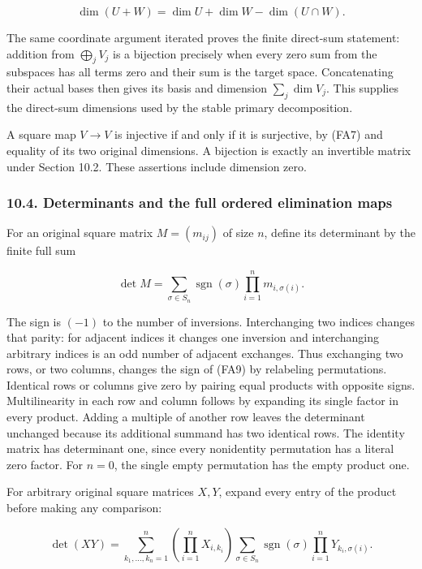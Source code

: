 \documentclass[
  11pt,
]{article}
\begin{document}
\[
\dim(U+W)=\dim U+\dim W-\dim(U\cap W).
\tag{FA8}
\]

The same coordinate argument iterated proves the finite direct-sum
statement: addition from \(\bigoplus_j V_j\) is a bijection precisely
when every zero sum from the subspaces has all terms zero and their sum
is the target space. Concatenating their actual bases then gives its
basis and dimension \(\sum_j\dim V_j\). This supplies the direct-sum
dimensions used by the stable primary decomposition.

A square map \(V\to V\) is injective if and only if it is surjective, by
(FA7) and equality of its two original dimensions. A bijection is
exactly an invertible matrix under Section 10.2. These assertions
include dimension zero.

\subsubsection{10.4. Determinants and the full ordered elimination
maps}\label{determinants-and-the-full-ordered-elimination-maps}

For an original square matrix \(M=(m_{ij})\) of size \(n\), define its
determinant by the finite full sum

\[
\det M=\sum_{\sigma\in S_n}\operatorname{sgn}(\sigma)
                  \prod_{i=1}^n m_{i,\sigma(i)}.
\tag{FA9}
\]

The sign is \((-1)\) to the number of inversions. Interchanging two
indices changes that parity: for adjacent indices it changes one
inversion and interchanging arbitrary indices is an odd number of
adjacent exchanges. Thus exchanging two rows, or two columns, changes
the sign of (FA9) by relabeling permutations. Identical rows or columns
give zero by pairing equal products with opposite signs. Multilinearity
in each row and column follows by expanding its single factor in every
product. Adding a multiple of another row leaves the determinant
unchanged because its additional summand has two identical rows. The
identity matrix has determinant one, since every nonidentity permutation
has a literal zero factor. For \(n=0\), the single empty permutation has
the empty product one.

For arbitrary original square matrices \(X,Y\), expand every entry of
the product before making any comparison:

\[
\det(XY)=\sum_{k_1,\ldots,k_n=1}^n
 \left(\prod_{i=1}^n X_{i,k_i}\right)
 \sum_{\sigma\in S_n}\operatorname{sgn}(\sigma)
                  \prod_{i=1}^n Y_{k_i,\sigma(i)}.
\tag{FA10}
\]
\end{document}
